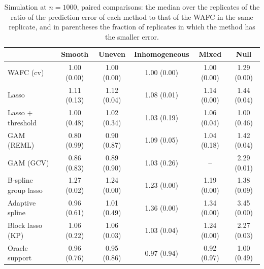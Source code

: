 \begin{table}[tp]
\color{colR1}
\caption{Simulation at $n = 1000$, paired comparisons: the median over the replicates of the ratio of the prediction error of each method to that of the WAFC in the same replicate, and in parentheses the fraction of replicates in which the method has the smaller error.}
\label{tab:sim-paired}
\centering
\small
\setlength{\tabcolsep}{6pt}
\begin{tabular}{lccccc}
\hline
 & Smooth & Uneven & Inhomogeneous & Mixed & Null \\
\hline
WAFC (cv) & 1.00 (0.00) & 1.00 (0.00) & 1.00 (0.00) & 1.00 (0.00) & 1.29 (0.00) \\
Lasso & 1.11 (0.13) & 1.12 (0.04) & 1.08 (0.01) & 1.14 (0.00) & 1.44 (0.04) \\
Lasso + threshold & 1.00 (0.48) & 1.02 (0.34) & 1.03 (0.19) & 1.06 (0.04) & 1.00 (0.46) \\
GAM (REML) & 0.80 (0.99) & 0.90 (0.87) & 1.09 (0.05) & 1.04 (0.18) & 1.42 (0.04) \\
GAM (GCV) & 0.86 (0.83) & 0.89 (0.90) & 1.03 (0.26) & -- & 2.29 (0.01) \\
B-spline group lasso & 1.27 (0.02) & 1.24 (0.00) & 1.23 (0.00) & 1.19 (0.00) & 1.38 (0.09) \\
Adaptive spline & 0.96 (0.61) & 1.01 (0.49) & 1.36 (0.00) & 1.34 (0.00) & 3.45 (0.00) \\
Block lasso (KP) & 1.06 (0.22) & 1.06 (0.03) & 1.03 (0.04) & 1.24 (0.00) & 2.27 (0.03) \\
Oracle support & 0.96 (0.76) & 0.95 (0.86) & 0.97 (0.94) & 0.92 (0.97) & 1.00 (0.49) \\
\hline
\end{tabular}
\end{table}

